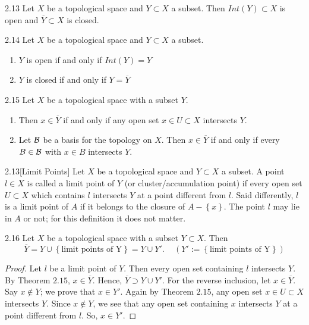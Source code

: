 \begin{customlemma}{2.13}
Let $X$ be a topological space and $Y \subset X$ a subset. Then $Int(Y) \subset X$ is open and $\overline{Y} \subset X$ is closed.
\end{customlemma}

\begin{customlemma}{2.14}
Let $X$ be a topological space and $Y \subset X$ a subset.
\begin{enumerate}
    \item[1).] $Y$ is open if and only if $Int(Y) = Y$
    \item[2).] $Y$ is closed if and only if $Y = \overline{Y}$
\end{enumerate}
\end{customlemma}

\begin{customthm}{2.15}
Let $X$ be a topological space with a subset $Y$.
\begin{enumerate}
    \item[1).] Then $x \in \overline{Y}$ if and only if any open set $x\in U \subset X$ intersects $Y$.
    \item[2).] Let $\mathcal{B}$ be a basis for the topology on $X$. Then $x \in \overline{Y}$ if and only if every $B \in \mathcal{B}$ with $x \in B$ intersects $Y$.
\end{enumerate}
\end{customthm}

\begin{customdefinition}{2.13}[Limit Points]
Let $X$ be a topological space and $Y \subset X$ a subset. A point $l \in X$ is called a limit point of $Y$ (or cluster/accumulation point) if every open set $U \subset X$ which contains $l$ intersects $Y$ at a point different from $l$. Said differently, $l$ is a limit point of $A$ if it belongs to the closure of $A - \left\{x\right\}$. The point $l$ may lie in $A$ or not; for this definition it does not matter.
\end{customdefinition}

\begin{customthm}{2.16}
Let $X$ be a topological space with a subset $Y \subset X$. Then
$$\overline{Y} = Y \cup \left\{\text{limit points of Y}\right\} = Y \cup Y'. \,\,\,\,\,\,\, (Y' := \left\{\text{limit points of Y}\right\})$$
\end{customthm}

\begin{proof}
Let $l$ be a limit point of $Y$. Then every open set containing $l$ intersects $Y$. By Theorem $2.15$, $x\in \overline{Y}$. Hence, $\overline{Y} \supset Y \cup Y'$. For the reverse inclusion, let $x \in \overline{Y}$. Say $x \notin Y$; we prove that $x\in Y'$. Again by Theorem $2.15$, any open set $x \in U \subset X$ intersects $Y$. Since $x\notin Y$, we see that any open set containing $x$ intersects $Y$ at a point different from $l$. So, $x \in Y'$.
\end{proof}


